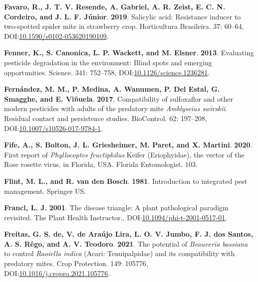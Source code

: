 \documentclass[12pt,final,CPage]{ufthesis}
\newlength{\cslhangindent}
\newenvironment{CSLReferences}[2] %
{%
	\setlength{\parindent}{0pt}
	\ifodd #1 \everypar{\setlength{\hangindent}{\cslhangindent}}\ignorespaces\fi
	\ifnum #2 > 0
	\setlength{\parskip}{#2\baselineskip}
	\fi
}%
{}
\begin{document}
{\begin{CSLReferences}{1}{0}
  \leavevmode{}%
  \textbf{Favaro, R., J. T. V. Resende, A. Gabriel, A. R. Zeist, E. C. N. Cordeiro, and J. L. F. Júnior}. \textbf{2019}. Salicylic acid: Resistance inducer to two-spotted spider mite in strawberry crop. Horticultura Brasileira. 37: 60--64, DOI:\href{https://doi.org/10.1590/s0102-053620190109}{10.1590/s0102-053620190109}.

  \leavevmode{}%
  \textbf{Fenner, K., S. Canonica, L. P. Wackett, and M. Elsner}. \textbf{2013}. Evaluating pesticide degradation in the environment: Blind spots and emerging opportunities. Science. 341: 752--758, DOI:\href{https://doi.org/10.1126/science.1236281}{10.1126/science.1236281}.

  \leavevmode{}%
  \textbf{Fernández, M. M., P. Medina, A. Wanumen, P. Del Estal, G. Smagghe, and E. Viñuela}. \textbf{2017}. Compatibility of sulfoxaflor and other modern pesticides with adults of the predatory mite {\emph{Amblyseius swirskii}}. Residual contact and persistence studies. {BioControl}. 62: 197--208, DOI:\href{https://doi.org/10.1007/s10526-017-9784-1}{10.1007/s10526-017-9784-1}.

  \leavevmode{}%
  \textbf{Fife, A., S. Bolton, J. L. Griesheimer, M. Paret, and X. Martini}. \textbf{2020}. First report of {\emph{Phyllocoptes fructiphilus}} {Keifer} ({Eriophyidae}), the vector of the {Rose rosette virus}, in {Florida}, {USA}. Florida Entomologist. 103.

  \leavevmode{}%
  \textbf{Flint, M. L., and R. van den Bosch}. \textbf{1981}. Introduction to integrated pest management. Springer {US}.

  \leavevmode{}%
  \textbf{Francl, L. J.} \textbf{2001}. The disease triangle: A plant pathological paradigm revisited. The Plant Health Instructor., DOI:\href{https://doi.org/10.1094/phi-t-2001-0517-01}{10.1094/phi-t-2001-0517-01}.

  \leavevmode{}%
  \textbf{Freitas, G. S. de, V. de Araújo Lira, L. O. V. Jumbo, F. J. dos Santos, A. S. Rêgo, and A. V. Teodoro}. \textbf{2021}. The potential of {\emph{Beauveria bassiana}} to control {\emph{Raoiella indica}} ({Acari}: {Tenuipalpidae}) and its compatibility with predatory mites. Crop Protection. 149: 105776, DOI:\href{https://doi.org/10.1016/j.cropro.2021.105776}{10.1016/j.cropro.2021.105776}.


\end{CSLReferences}}
\end{document}
